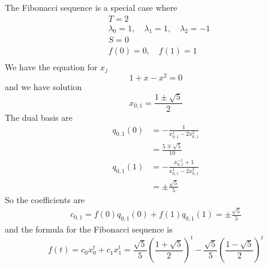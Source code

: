 \documentclass[]{article}
\begin{document}
The Fibonacci sequence is a special case where
\begin{align*}
	&T = 2\\
&	\lambda_0 = 1,\quad\lambda_1 = 1,\quad\lambda_2 = -1\\
	&S = 0\\
&	f(0) = 0,\quad f(1) = 1\\
\end{align*}
We have the equation for $x_j$
\[
1 + x - x^2 = 0
\]
and we have solution
\[
x_{0,1} = \frac{1\pm\sqrt{5}}{2}
\]
The dual basis are
\begin{align*}
q_{0,1}(0) &= -\frac{1}{x_{0,1}^1 - 2x_{0,1}^2}\\
&=\frac{5\mp\sqrt{5}}{10}  \\ 
q_{0,1}(1) &= -\frac{x_{0,1}^{-1} + 1}{x_{0,1}^1 - 2x_{0,1}^2}\\
&=\pm\frac{\sqrt{5}}{5} 
\end{align*}
So the coefficients are
\begin{align*}
	c_{0,1} = f(0)q_{0,1}(0) + f(1)q_{0,1}(1) = \pm\frac{\sqrt{5}}{5} 
\end{align*}
and the formula for the Fibonacci sequence is
\[
f(t) = c_0x_0^t + c_1x_1^t  =\frac{\sqrt{5}}{5} \left(\frac{1+\sqrt{5}}{2}\right)^t - \frac{\sqrt{5}}{5} \left(\frac{1-\sqrt{5}}{2}\right)^t
\]



\end{document}
